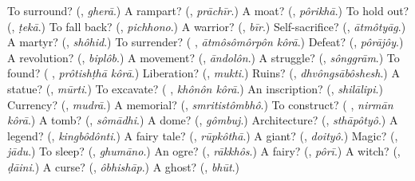\begin{tcolorbox}[breakable,colback=teal!4,colframe=teal!35!black,title={Before you move on}]
To surround? (\textbf{}, \emph{gherā}.) A rampart? (\textbf{}, \emph{prāchīr}.) A moat? (\textbf{}, \emph{pôrikhā}.) To hold out? (\textbf{}, \emph{ṭekā}.) To fall back? (\textbf{}, \emph{pichhono}.) A warrior? (\textbf{}, \emph{bīr}.) Self-sacrifice? (\textbf{}, \emph{ātmôtyāg}.) A martyr? (\textbf{}, \emph{shôhid}.) To surrender? (\textbf{ }, \emph{ātmôsômôrpôn kôrā}.) Defeat? (\textbf{}, \emph{pôrājôy}.) A revolution? (\textbf{}, \emph{biplôb}.) A movement? (\textbf{}, \emph{āndolôn}.) A struggle? (\textbf{}, \emph{sônggrām}.) To found? (\textbf{ }, \emph{prôtishṭhā kôrā}.) Liberation? (\textbf{}, \emph{mukti}.) Ruins? (\textbf{}, \emph{dhvôngsābôshesh}.) A statue? (\textbf{}, \emph{mūrti}.) To excavate? (\textbf{ }, \emph{khônôn kôrā}.) An inscription? (\textbf{}, \emph{shilālipi}.) Currency? (\textbf{}, \emph{mudrā}.) A memorial? (\textbf{}, \emph{smritistômbhô}.) To construct? (\textbf{ }, \emph{nirmān kôrā}.) A tomb? (\textbf{}, \emph{sômādhi}.) A dome? (\textbf{}, \emph{gômbuj}.) Architecture? (\textbf{}, \emph{sthāpôtyô}.) A legend? (\textbf{}, \emph{kingbôdônti}.) A fairy tale? (\textbf{}, \emph{rūpkôthā}.) A giant? (\textbf{}, \emph{doityô}.) Magic? (\textbf{}, \emph{jādu}.) To sleep? (\textbf{}, \emph{ghumāno}.) An ogre? (\textbf{}, \emph{rākkhôs}.) A fairy? (\textbf{}, \emph{pôrī}.) A witch? (\textbf{}, \emph{ḍāini}.) A curse? (\textbf{}, \emph{ôbhishāp}.) A ghost? (\textbf{}, \emph{bhūt}.)
\end{tcolorbox}
